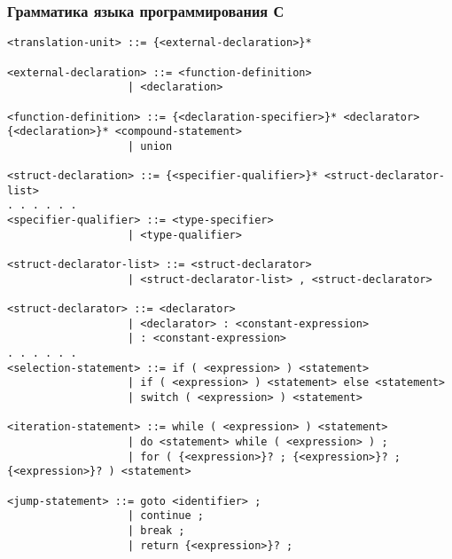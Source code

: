 \documentclass[10pt]{beamer}
\newcommand{\ltprgsize}{\fontsize{5}{5}\selectfont}
\begin{document}
\begin{frame}[fragile]
  \frametitle{Грамматика языка программирования С}
  {\ltprgsize
 \begin{verbatim}
<translation-unit> ::= {<external-declaration>}*

<external-declaration> ::= <function-definition>
                   | <declaration>

<function-definition> ::= {<declaration-specifier>}* <declarator> {<declaration>}* <compound-statement>
                   | union

<struct-declaration> ::= {<specifier-qualifier>}* <struct-declarator-list>
. . . . . .
<specifier-qualifier> ::= <type-specifier>
                   | <type-qualifier>

<struct-declarator-list> ::= <struct-declarator>
                   | <struct-declarator-list> , <struct-declarator>

<struct-declarator> ::= <declarator>
                   | <declarator> : <constant-expression>
                   | : <constant-expression>
. . . . . .
<selection-statement> ::= if ( <expression> ) <statement>
                   | if ( <expression> ) <statement> else <statement>
                   | switch ( <expression> ) <statement>

<iteration-statement> ::= while ( <expression> ) <statement>
                   | do <statement> while ( <expression> ) ;
                   | for ( {<expression>}? ; {<expression>}? ; {<expression>}? ) <statement>

<jump-statement> ::= goto <identifier> ;
                   | continue ;
                   | break ;
                   | return {<expression>}? ;
\end{verbatim}}
\end{frame}
\end{document}
